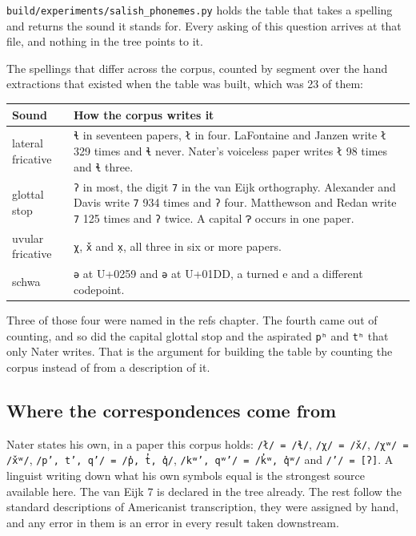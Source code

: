 \texttt{build/\allowbreak{}experiments/\allowbreak{}salish\_\allowbreak{}phonemes.\allowbreak{}py}
holds the table that takes a spelling and returns the sound it stands for. Every asking of this
question arrives at that file, and nothing in the tree points to it.

The spellings that differ across the corpus, counted by segment over the hand extractions that
existed when the table was built, which was 23 of them:

\tiny
\setlength{\tabcolsep}{2pt}
\begin{longtable}{@{}>{\arraybackslash}p{}>{\arraybackslash}p{}@{}}
\toprule
Sound & How the corpus writes it \\
\midrule
lateral fricative & \texttt{ɬ} in seventeen papers, \texttt{ł} in four. LaFontaine and Janzen write \texttt{ł} 329 times and \texttt{ɬ} never. Nater's voiceless paper writes \texttt{ł} 98 times and \texttt{ɬ} three. \\
glottal stop & \texttt{ʔ} in most, the digit \texttt{7} in the van Eijk orthography. Alexander and Davis write \texttt{7} 934 times and \texttt{ʔ} four. Matthewson and Redan write \texttt{7} 125 times and \texttt{ʔ} twice. A capital \texttt{Ɂ} occurs in one paper. \\
uvular fricative & \texttt{χ}, \texttt{x̌} and \texttt{x̣}, all three in six or more papers. \\
schwa & \texttt{ə} at U+0259 and \texttt{ǝ} at U+01DD, a turned e and a different codepoint. \\
\bottomrule
\end{longtable}
\normalsize

Three of those four were named in the refs chapter. The fourth came out of counting, and so did the
capital glottal stop and the aspirated \texttt{pʰ} and \texttt{tʰ} that only Nater writes. That is
the argument for building the table by counting the corpus instead of from a description of it.

\subsection{Where the correspondences come from}

Nater states his own, in a paper this corpus holds: \texttt{/ł/ = /ɬ/}, \texttt{/χ/ = /x̌/},
\texttt{/χʷ/ = /x̌ʷ/}, \texttt{/p’, t’, q’/ = /p̓, t̓, q̓/}, \texttt{/kʷ’, qʷ’/ = /k̓ʷ, q̓ʷ/} and
\texttt{/’/ = [ʔ]}. A linguist writing down what his own symbols equal is the strongest source
available here. The van Eijk 7 is declared in the tree already. The rest follow the standard
descriptions of Americanist transcription, they were assigned by hand, and any error in them is an
error in every result taken downstream.

